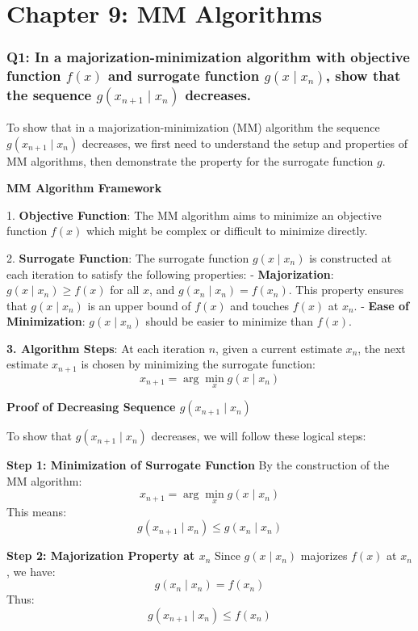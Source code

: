 \documentclass[8pt]{article}
\begin{document}
\newpage
\section*{Chapter 9: MM Algorithms}
\subsubsection*{Q1: In a majorization-minimization algorithm with objective function \(f(x)\) and surrogate function \(g(x \mid x_n)\), show that the sequence \(g(x_{n+1} \mid x_n)\) decreases.}

To show that in a majorization-minimization (MM) algorithm the sequence \(g(x_{n+1} \mid x_n)\) decreases, we first need to understand the setup and properties of MM algorithms, then demonstrate the property for the surrogate function \(g\).

\textbf{MM Algorithm Framework}

1. \textbf{Objective Function}:
   The MM algorithm aims to minimize an objective function \(f(x)\) which might be complex or difficult to minimize directly.

2. \textbf{Surrogate Function}:
   The surrogate function \(g(x \mid x_n)\) is constructed at each iteration to satisfy the following properties:
   - \textbf{Majorization}: \(g(x \mid x_n) \geq f(x)\) for all \(x\), and \(g(x_n \mid x_n) = f(x_n)\). This property ensures that \(g(x \mid x_n)\) is an upper bound of \(f(x)\) and touches \(f(x)\) at \(x_n\).
   - \textbf{Ease of Minimization}: \(g(x \mid x_n)\) should be easier to minimize than \(f(x)\).

\textbf{3. Algorithm Steps}:
   At each iteration \(n\), given a current estimate \(x_n\), the next estimate \(x_{n+1}\) is chosen by minimizing the surrogate function:
   \[
   x_{n+1} = \arg \min_x g(x \mid x_n)
   \]

\textbf{Proof of Decreasing Sequence \(g(x_{n+1} \mid x_n)\)}

To show that \(g(x_{n+1} \mid x_n)\) decreases, we will follow these logical steps:

\textbf{Step 1: Minimization of Surrogate Function}
By the construction of the MM algorithm:
\[
x_{n+1} = \arg \min_x g(x \mid x_n)
\]
This means:
\[
g(x_{n+1} \mid x_n) \leq g(x_n \mid x_n)
\]

\textbf{Step 2: Majorization Property at \(x_n\)}
Since \(g(x \mid x_n)\) majorizes \(f(x)\) at \(x_n\), we have:
\[
g(x_n \mid x_n) = f(x_n)
\]
Thus:
\[
g(x_{n+1} \mid x_n) \leq f(x_n)
\]
\end{document}

